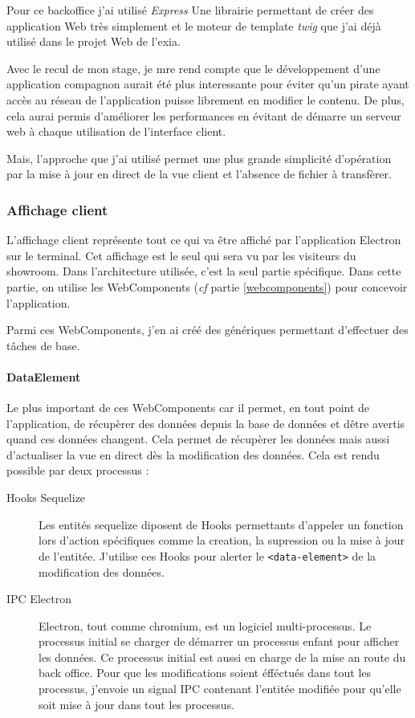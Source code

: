 Pour ce backoffice j'ai utilisé \emph{Express} Une librairie permettant de créer des application Web très simplement et le moteur de template \emph{twig} que j'ai déjà utilisé dans le projet Web de l'exia.

\bigskip

Avec le recul de mon stage, je mre rend compte que le développement d'une application compagnon aurait été plus interessante pour éviter qu'un pirate ayant accès au réseau de l'application puisse librement en modifier le contenu.
De plus, cela aurai permis d'améliorer les performances en évitant de démarre un serveur web à chaque utilisation de l'interface client.

Mais, l'approche que j'ai utilisé permet une plus grande simplicité d'opération par la mise à jour en direct de la vue client et l'absence de fichier à transfèrer.

\subsubsection{Affichage client}

 L'affichage client représente tout ce qui va être affiché par l'application Electron sur le terminal.
Cet affichage est le seul qui sera vu par les visiteurs du showroom.
Dans l'architecture utilisée, c'est la seul partie spécifique.
Dans cette partie, on utilise les WebComponents (\emph{cf} partie \ref{webcomponents}) pour concevoir l'application.

Parmi ces WebComponents, j'en ai créé des génériques permettant d'effectuer des tâches de base.


\paragraph{DataElement} Le plus important de ces WebComponents car il permet, en tout point de l'application, de récupèrer des données depuis la base de données et dêtre avertis quand ces données changent.
Cela permet de récupèrer les données mais aussi d'actualiser la vue en direct dès la modification des données.
Cela est rendu possible par deux processus :
\begin{description}
    \item[Hooks Sequelize] Les entités sequelize diposent de Hooks permettants d'appeler un fonction lors d'action spécifiques comme la creation, la supression ou la mise à jour de l'entitée. J'utilise ces Hooks pour alerter le \texttt{<data-element>} de la modification des données.
    \item[IPC Electron] Electron, tout comme chromium, est un logiciel multi-processus. Le processus initial se charger de démarrer un processus enfant pour afficher les données. Ce processus initial est aussi en charge de la mise an route du back office. Pour que les modifications soient éfféctués dans tout les processus, j'envoie un signal IPC contenant l'entitée modifiée pour qu'elle soit mise à jour dans tout les processus.
\end{description}

